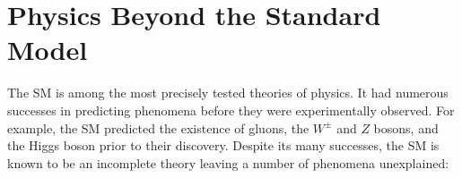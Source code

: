 \section{Physics Beyond the Standard Model}%
\label{sec:bsm}

The SM is among the most precisely tested theories of physics. It had numerous
successes in predicting phenomena before they were experimentally observed. For
example, the SM predicted the existence of gluons, the $W^\pm$ and $Z$ bosons,
and the Higgs boson prior to their discovery.
Despite its many successes, the SM is known to be an incomplete theory leaving a
number of phenomena unexplained:
